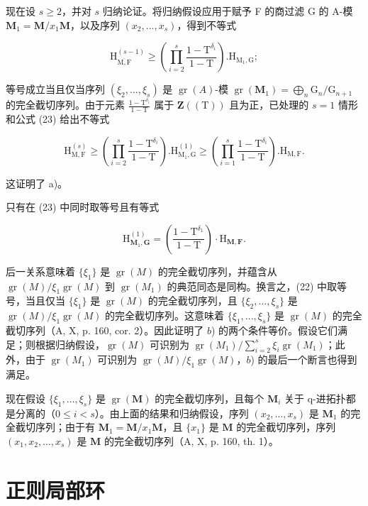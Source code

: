 现在设 \(s \geqslant 2\)，并对 \(s\) 归纳论证。将归纳假设应用于赋予 F 的商过滤 G 的 A-模 \(\mathbf{M}_{1} = \mathbf{M}/x_{1}\mathbf{M}\)，以及序列 \((x_{2}, ..., x_{s})\)，得到不等式

\[
\mathrm{H} _ {\overline {{\mathrm{M,F}}}} ^ {(s - 1)} \geqslant \left(\prod_ {i = 2} ^ {s} \frac {1 - \mathrm{T} ^ {\delta_ {i}}}{1 - \mathrm{T}}\right). \mathrm{H} _ {\mathrm{M} _ {1}, \mathrm{G}};\tag{23}
\]

等号成立当且仅当序列 \((\xi_{2}, \ldots, \xi_{s})\) 是 \(\operatorname{gr}(A)\)-模 \(\operatorname{gr}(\mathbf{M}_{1}) = \bigoplus_{n} \mathrm{G}_{n}/\mathrm{G}_{n+1}\) 的完全截切序列。由于元素 \(\frac{1 - \mathrm{T}^{\delta_{i}}}{1 - \mathrm{T}}\) 属于 \(\mathbf{Z}((\mathrm{T}))\) 且为正，已处理的 \(s = 1\) 情形和公式 (23) 给出不等式

\[
\mathrm{H} _ {\mathrm{M}, \mathrm{F}} ^ {(s)} \geqslant \left(\prod_ {i = 2} ^ {s} \frac {1 - \mathrm{T} ^ {\delta_ {i}}}{1 - \mathrm{T}}\right). \mathrm{H} _ {\mathrm{M} _ {1}, \mathrm{G}} ^ {(1)} \geqslant \left(\prod_ {i = 1} ^ {s} \frac {1 - \mathrm{T} ^ {\delta_ {i}}}{1 - \mathrm{T}}\right). \mathrm{H} _ {\mathrm{M}, \mathrm{F}}.\tag{24}
\]

这证明了 a)。

只有在 (23) 中同时取等号且有等式

\[
\mathrm{H} _ {\mathbf {M} _ {1}, \mathbf {G}} ^ {(1)} = \left(\frac {1 - \mathrm{T} ^ {\delta_ {1}}}{1 - \mathrm{T}}\right) \cdot \mathrm{H} _ {\mathbf {M}, \mathbf {F}}.\tag{25}
\]

后一关系意味着 \(\{\xi_{1}\}\) 是 \(\operatorname{gr}(M)\) 的完全截切序列，并蕴含从 \(\operatorname{gr}(M)/\xi_{1}\operatorname{gr}(M)\) 到 \(\operatorname{gr}(M_{1})\) 的典范同态是同构。换言之，(22) 中取等号，当且仅当 \(\{\xi_{1}\}\) 是 \(\operatorname{gr}(M)\) 的完全截切序列，且 \(\{\xi_{2}, ..., \xi_{s}\}\) 是 \(\operatorname{gr}(M)/\xi_{1}\operatorname{gr}(M)\) 的完全截切序列。这意味着 \(\{\xi_{1}, ..., \xi_{s}\}\) 是 \(\operatorname{gr}(M)\) 的完全截切序列（A, X, p. 160, cor. 2）。因此证明了 \(b\)) 的两个条件等价。假设它们满足；则根据归纳假设，\(\operatorname{gr}(M)\) 可识别为 \(\operatorname{gr}(M_{1})/\sum_{i=2}^{s} \xi_{i}\operatorname{gr}(M_{1})\)；此外，由于 \(\operatorname{gr}(M_{1})\) 可识别为 \(\operatorname{gr}(M)/\xi_{1}\operatorname{gr}(M)\)，\(b\)) 的最后一个断言也得到满足。

现在假设 \(\{\xi_1, \ldots, \xi_s\}\) 是 \(\operatorname{gr}(\mathbf{M})\) 的完全截切序列，且每个 \(\mathbf{M}_i\) 关于 q-进拓扑都是分离的（\(0 \leqslant i < s\)）。由上面的结果和归纳假设，序列 \((x_2, \ldots, x_s)\) 是 \(\mathbf{M}_1\) 的完全截切序列；由于有 \(\mathbf{M}_1 = \mathbf{M}/x_1\mathbf{M}\)，且 \(\{x_1\}\) 是 \(\mathbf{M}\) 的完全截切序列，序列 \((x_1, x_2, \ldots, x_s)\) 是 \(\mathbf{M}\) 的完全截切序列（A, X, p. 160, th. 1）。

\section{正则局部环}
